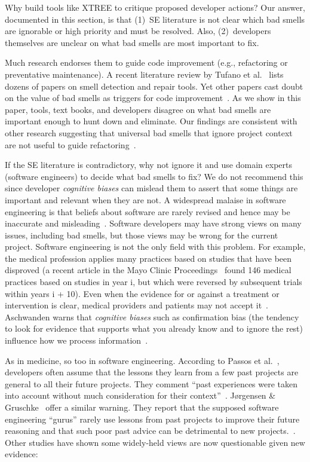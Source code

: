 \documentclass[twocolumn,5p]{elsarticle}
\theoremstyle{break}
\begin{document}
Why build tools like XTREE to  critique proposed developer actions?
Our answer, documented in this section, is that (1)~SE literature is not clear which bad smells are ignorable or  high priority and must be resolved.
Also, (2)~developers themselves are unclear on what bad smells are most important to fix.
 
 
Much research endorses them to guide
code improvement (e.g., refactoring or preventative maintenance). A recent literature review by Tufano et al.~\cite{Tufano2015}  
lists dozens of papers on smell detection and repair tools. 
Yet
other papers cast doubt on the value of bad smells
as triggers for code improvement~\cite{Mantyla2004,Yamashita2013,Sjoberg2013}. 
As we show in this paper,  
 tools, text books, and developers disagree on what bad smells
are important enough to hunt down and eliminate. Our findings
are consistent with other research suggesting that universal bad
smells that ignore project context are not useful to guide refactoring~\cite{Mantyla2004,Yamashita2013,Sjoberg2013}.

If the SE literature is contradictory, why not ignore it and use domain experts (software engineers) to decide
what bad smells to fix? We do not recommend this since developer {\em cognitive biases} can mislead them to
assert that some things are important and relevant when they are not. 
A widespread malaise in software engineering is that
beliefs about software are rarely revised and hence may be
  inaccurate and 
misleading~\cite{passos11,jorgensen09,mei15,me16phase,prem16}. Software developers may have strong views on many issues, including bad smells, but those views may be wrong for the current
project.
Software engineering is not the only field with this problem.
  For example, the medical profession applies many practices based on studies that have been disproved (a recent article in the Mayo Clinic Proceedings~\cite{prasad13} found 146 medical practices based on studies in year i, but which were reversed by subsequent trials within years i + 10). Even when the evidence for or against a treatment or intervention is clear, medical providers and patients may not accept it~\cite{aschwanden10}. Aschwanden warns that {\em cognitive biases} such as confirmation bias (the tendency to look for evidence that supports what you already know and to ignore the rest) influence how we process information~\cite{aschwanden15}.

As in medicine, so too in software engineering.
According to Passos et al.~\cite{passos11},  developers often  assume that the lessons they learn from a few past projects are general to all their future projects. They comment ``past experiences were taken into account without much consideration for their context''~\cite{passos11}.  J{\o}rgensen \& Gruschke~\cite{jorgensen09} offer a similar warning. They report that the supposed software engineering ``gurus'' rarely use lessons from past projects to improve their future reasoning and that such poor past advice can be detrimental to new projects.~\cite{jorgensen09}. Other studies have shown some widely-held views are   now questionable given new evidence:
\end{document}
